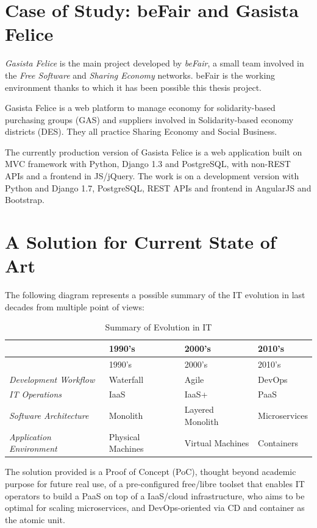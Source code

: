 \section{Case of Study: beFair and Gasista
Felice}\label{case-of-study-befair-and-gasista-felice}

\textit{Gasista Felice} is the main project developed by \textit{beFair}, a
small team involved in the \textit{Free Software} and \textit{Sharing
Economy} networks. beFair is the working environment thanks to which it
has been possible this thesis project.

Gasista Felice is a web platform to manage economy for solidarity-based
purchasing groups (GAS) and suppliers involved in Solidarity-based
economy districts (DES). They all practice Sharing Economy and Social
Business.

The currently production version of Gasista Felice is a web application
built on MVC framework with Python, Django 1.3 and PostgreSQL, with
non-REST APIs and a frontend in JS/jQuery. The work is on a development
version with Python and Django 1.7, PostgreSQL, REST APIs and frontend
in AngularJS and Bootstrap.

\section{A Solution for Current State of
Art}\label{a-solution-for-current-state-of-art}

The following diagram represents a possible summary of the IT evolution
in last decades from multiple point of views:

\begin{longtable}[c]{@{}llll@{}}
\caption{Summary of Evolution in IT}\tabularnewline
\toprule
& 1990's & 2000's & 2010's\tabularnewline
\midrule
\endfirsthead
\toprule
& 1990's & 2000's & 2010's\tabularnewline
\midrule
\endhead
\textit{Development Workflow} & Waterfall & Agile & DevOps\tabularnewline
\textit{IT Operations} & IaaS & IaaS+ & PaaS\tabularnewline
\textit{Software Architecture} & Monolith & Layered Monolith &
Microservices\tabularnewline
\textit{Application Environment} & Physical Machines & Virtual Machines &
Containers\tabularnewline
\bottomrule
\end{longtable}

The solution provided is a Proof of Concept (PoC), thought beyond academic purpose for future real use, of a pre-configured free/libre toolset that enables IT operators to build a PaaS on top of a IaaS/cloud infrastructure, who aims to be optimal for scaling microservices, and DevOps-oriented via CD and container as the atomic unit.

